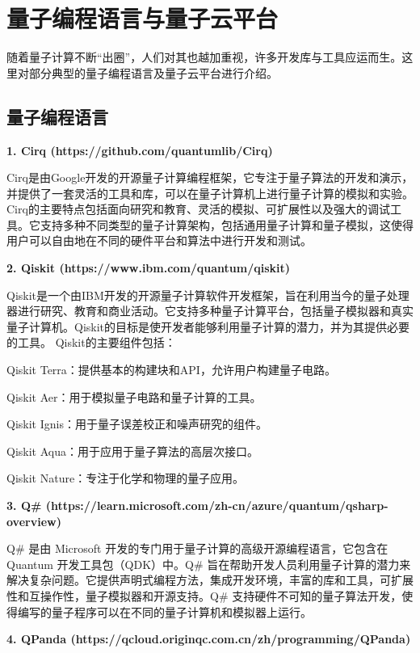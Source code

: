 \section{量子编程语言与量子云平台}
随着量子计算不断“出圈”，人们对其也越加重视，许多开发库与工具应运而生。这里对部分典型的量子编程语言及量子云平台进行介绍。
\subsection{量子编程语言}
\textbf{1. Cirq (https://github.com/quantumlib/Cirq)}

Cirq是由Google开发的开源量子计算编程框架，它专注于量子算法的开发和演示，并提供了一套灵活的工具和库，可以在量子计算机上进行量子计算的模拟和实验。Cirq的主要特点包括面向研究和教育、灵活的模拟、可扩展性以及强大的调试工具。它支持多种不同类型的量子计算架构，包括通用量子计算和量子模拟，这使得用户可以自由地在不同的硬件平台和算法中进行开发和测试。

\textbf{2. Qiskit (https://www.ibm.com/quantum/qiskit)}

Qiskit是一个由IBM开发的开源量子计算软件开发框架，旨在利用当今的量子处理器进行研究、教育和商业活动。它支持多种量子计算平台，包括量子模拟器和真实量子计算机。Qiskit的目标是使开发者能够利用量子计算的潜力，并为其提供必要的工具。
Qiskit的主要组件包括：

\begin{paralist}
    \item Qiskit Terra：提供基本的构建块和API，允许用户构建量子电路。
    \item Qiskit Aer：用于模拟量子电路和量子计算的工具。
    \item Qiskit Ignis：用于量子误差校正和噪声研究的组件。
    \item Qiskit Aqua：用于应用于量子算法的高层次接口。
    \item Qiskit Nature：专注于化学和物理的量子应用。
\end{paralist}


\textbf{3. Q\# (https://learn.microsoft.com/zh-cn/azure/quantum/qsharp-overview)}

Q\# 是由 Microsoft 开发的专门用于量子计算的高级开源编程语言，它包含在 Quantum 开发工具包（QDK）中。Q\# 旨在帮助开发人员利用量子计算的潜力来解决复杂问题。它提供声明式编程方法，集成开发环境，丰富的库和工具，可扩展性和互操作性，量子模拟器和开源支持。Q\# 支持硬件不可知的量子算法开发，使得编写的量子程序可以在不同的量子计算机和模拟器上运行。

\textbf{4. QPanda (https://qcloud.originqc.com.cn/zh/programming/QPanda)}

